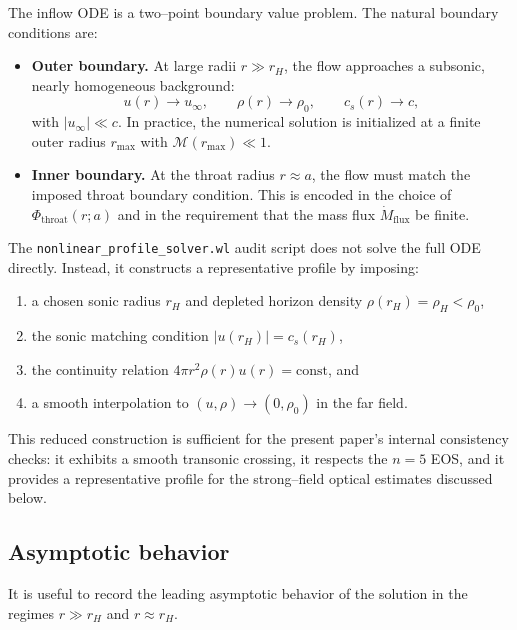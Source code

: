 \documentclass[11pt]{article}
\begin{document}
The inflow ODE is a two--point boundary value problem.  The natural boundary
conditions are:
\begin{itemize}
  \item \textbf{Outer boundary.}  At large radii \(r \gg r_H\), the flow
        approaches a subsonic, nearly homogeneous background:
        \[
          u(r) \to u_{\infty}, \qquad
          \rho(r) \to \rho_0, \qquad
          c_s(r) \to c,
        \]
        with \(|u_{\infty}| \ll c\).  In practice, the numerical solution is
        initialized at a finite outer radius \(r_{\max}\) with
        \(\mathcal{M}(r_{\max}) \ll 1\).
  \item \textbf{Inner boundary.}  At the throat radius \(r \approx a\), the
        flow must match the imposed throat boundary condition.  This is
        encoded in the choice of \(\Phi_{\text{throat}}(r; a)\) and in the
        requirement that the mass flux \(\dot{M}_{\text{flux}}\) be finite.
\end{itemize}

The \texttt{nonlinear\_profile\_solver.wl} audit script does not solve the
full ODE directly.  Instead, it constructs a representative profile by
imposing:
\begin{enumerate}
  \item a chosen sonic radius \(r_H\) and depleted horizon density
        \(\rho(r_H)=\rho_H<\rho_0\),
  \item the sonic matching condition \(|u(r_H)|=c_s(r_H)\),
  \item the continuity relation \(4\pi r^2 \rho(r) u(r)=\text{const}\), and
  \item a smooth interpolation to \((u,\rho)\to(0,\rho_0)\) in the far field.
\end{enumerate}
This reduced construction is sufficient for the present paper's internal
consistency checks: it exhibits a smooth transonic crossing, it respects the
\(n=5\) EOS, and it provides a representative profile for the strong--field
optical estimates discussed below.

\subsection{Asymptotic behavior}
\label{app:inflow-asymptotics}

It is useful to record the leading asymptotic behavior of the solution in
the regimes \(r \gg r_H\) and \(r \approx r_H\).
\end{document}
